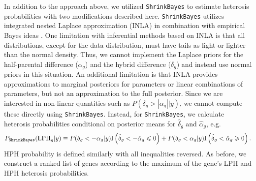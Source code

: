 \documentclass[useAMS,usenatbib,referee]{biom}
\newcommand{\ShrinkBayes}{{\tt ShrinkBayes}}
\begin{document}
In addition to the approach above, we utilized \ShrinkBayes{} to estimate heterosis probabilities with two modifications described here. \ShrinkBayes{} utilizes integrated nested Laplace approximation (INLA) \citep{rue2009approximate} in combination with empirical Bayes ideas \citep{van2014shrinkbayes}. One limitation with inferential methods based on INLA is that all distributions, except for the data distribution, must have tails as light or lighter than the normal density. Thus, we cannot implement the Laplace priors for the half-parental difference ($\alpha_g$) and the hybrid difference ($\delta_g$) and instead use normal priors in this situation. An additional limitation is that INLA provides approximations to marginal posteriors for parameters or linear combinations of parameters, but not an approximation to the full posterior. Since we are interested in non-linear quantities such as $P(\delta_g > |\alpha_g||y)$, we cannot compute these directly using \ShrinkBayes{}. Instead, for \ShrinkBayes{}, we calculate heterosis probabilities conditional on posterior means for $\hat{\delta}_g$ and $\hat{\alpha}_g$, e.g. 
\[ 
P_{\ShrinkBayes{}}(\mbox{LPH}_g|y) \equiv P(\delta_g<-\alpha_g|y)\mathrm{I}\left(\hat{\delta}_g < -\hat{\alpha}_g \le 0\right) + P(\delta_g<\alpha_g|y) \mathrm{I}\left(\hat{\delta}_g < \hat{\alpha}_g \ge 0\right).
\]
HPH probability is defined similarly with all inequalities reversed. As before, we construct a ranked list of genes according to the maximum of the gene's LPH and HPH heterosis probabilities.
\end{document}
